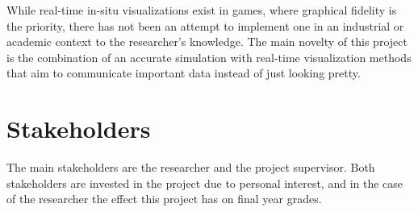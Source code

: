 While real-time in-situ visualizations exist in games, where graphical fidelity is the priority, there has not been an attempt to implement one in an industrial or academic context to the researcher's knowledge.
The main novelty of this project is the combination of an accurate simulation with real-time visualization methods that aim to communicate important data instead of just looking pretty.


\section{Stakeholders}
The main stakeholders are the researcher and the project supervisor.
Both stakeholders are invested in the project due to personal interest, and in the case of the researcher the effect this project has on final year grades.

